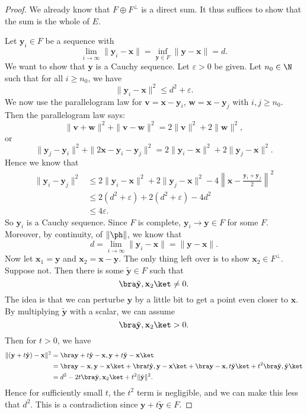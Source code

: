 \documentclass[a4paper]{article}
\begin{document}
\begin{proof}
  We already know that $F \oplus F^\perp$ is a direct sum. It thus suffices to show that the sum is the whole of $E$.

  Let $\mathbf{y}_i \in F$ be a sequence with
  \[
    \lim_{i \to \infty} \|\mathbf{y}_i - \mathbf{x}\| = \inf_{\mathbf{y} \in F} \|\mathbf{y} - \mathbf{x}\| = d.
  \]
  We want to show that $\mathbf{y}$ is a Cauchy sequence. Let $\varepsilon > 0$ be given. Let $n_0 \in \N$ such that for all $i \geq n_0$, we have
  \[
    \|\mathbf{y}_i - \mathbf{x}\|^2 \leq d^2 + \varepsilon.
  \]
  We now use the parallelogram law for $\mathbf{v} = \mathbf{x} - \mathbf{y}_i$, $\mathbf{w} = \mathbf{x} - \mathbf{y}_j$ with $i, j \geq n_0$. Then the parallelogram law says:
  \[
    \|\mathbf{v} + \mathbf{w}\|^2 + \|\mathbf{v} - \mathbf{w}\|^2 = 2\|\mathbf{v}\|^2 + 2\|\mathbf{w}\|^2,
  \]
  or
  \[
    \|\mathbf{y}_j - \mathbf{y}_i\|^2 + \|2\mathbf{x} - \mathbf{y}_i - \mathbf{y}_j\|^2 = 2\|\mathbf{y}_i - \mathbf{x}\|^2 + 2\|\mathbf{y}_j - \mathbf{x}\|^2.
  \]
  Hence we know that
  \begin{align*}
    \|\mathbf{y}_i - \mathbf{y}_j\|^2 &\leq 2\|\mathbf{y}_i - \mathbf{x}\|^2 + 2\|\mathbf{y}_j - \mathbf{x}\|^2 - 4\left\|\mathbf{x} - \frac{\mathbf{y}_i + \mathbf{y}_j}{2}\right\|^2\\
    &\leq 2(d^2 + \varepsilon) + 2(d^2 + \varepsilon) - 4d^2\\
    &\leq 4\varepsilon.
  \end{align*}
  So $\mathbf{y}_i$ is a Cauchy sequence. Since $F$ is complete, $\mathbf{y}_i \to \mathbf{y} \in F$ for some $F$. Moreover, by continuity, of $\|\ph\|$, we know that
  \[
    d = \lim_{i \to \infty}\|\mathbf{y}_i - \mathbf{x}\| = \|\mathbf{y} - \mathbf{x}\|.
  \]
  Now let $\mathbf{x}_1 = \mathbf{y}$ and $\mathbf{x}_2 = \mathbf{x} - \mathbf{y}$. The only thing left over is to show $\mathbf{x}_2 \in F^\perp$. Suppose not. Then there is some $\tilde{\mathbf{y}} \in F$ such that
  \[
    \bra \tilde{\mathbf{y}}, \mathbf{x}_2 \ket \not= 0.
  \]
  The idea is that we can perturbe $\mathbf{y}$ by a little bit to get a point even closer to $\mathbf{x}$. By multiplying $\tilde{\mathbf{y}}$ with a scalar, we can assume
  \[
    \bra \tilde{\mathbf{y}}, \mathbf{x}_2\ket > 0.
  \]
  Then for $t > 0$, we have
  \begin{align*}
    \|(\mathbf{y} + t\tilde{\mathbf{y}}) - \mathbf{x}\|^2 &= \bra \mathbf{y} + t\tilde{\mathbf{y}} - \mathbf{x}, \mathbf{y} + t\tilde{\mathbf{y}} - \mathbf{x}\ket \\
    &= \bra \mathbf{y} - \mathbf{x}, \mathbf{y} - \mathbf{x}\ket + \bra t\tilde{\mathbf{y}}, \mathbf{y} - \mathbf{x}\ket + \bra \mathbf{y} - \mathbf{x}, t\tilde{\mathbf{y}}\ket + t^2 \bra \tilde{\mathbf{y}}, \tilde{\mathbf{y}}\ket\\
    &= d^2 - 2t \bra \tilde{\mathbf{y}}, \mathbf{x}_2\ket + t^2 \|\tilde{\mathbf{y}}\|^2.
  \end{align*}
  Hence for sufficiently small $t$, the $t^2$ term is negligible, and we can make this less that $d^2$. This is a contradiction since $\mathbf{y} + t\tilde{\mathbf{y}} \in F$.
\end{proof}
\end{document}
